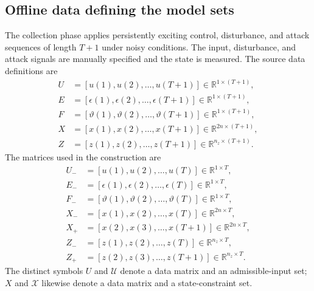 \documentclass{article}
\begin{document}
\subsection*{Offline data defining the model sets}
The collection phase applies persistently exciting control, disturbance, and attack sequences of length $T+1$ under noisy conditions. The input, disturbance, and attack signals are manually specified and the state is measured. The source data definitions are
\begin{align}
U&=[u(1),u(2),\ldots,u(T+1)]\in\mathbb{R}^{1\times(T+1)}, \tag{23a}\\
E&=[\epsilon(1),\epsilon(2),\ldots,\epsilon(T+1)]\in\mathbb{R}^{1\times(T+1)}, \tag{23b}\\
F&=[\vartheta(1),\vartheta(2),\ldots,\vartheta(T+1)]\in\mathbb{R}^{1\times(T+1)}, \tag{23c}\\
X&=[x(1),x(2),\ldots,x(T+1)]\in\mathbb{R}^{2n\times(T+1)}, \tag{23d}\\
Z&=[z(1),z(2),\ldots,z(T+1)]\in\mathbb{R}^{n_z\times(T+1)}. \tag{24}
\end{align}
The matrices used in the construction are
\begin{align}
U_-&=[u(1),u(2),\ldots,u(T)]\in\mathbb{R}^{1\times T}, \tag{25a}\\
E_-&=[\epsilon(1),\epsilon(2),\ldots,\epsilon(T)]\in\mathbb{R}^{1\times T}, \tag{25b}\\
F_-&=[\vartheta(1),\vartheta(2),\ldots,\vartheta(T)]\in\mathbb{R}^{1\times T}, \tag{25c}\\
X_-&=[x(1),x(2),\ldots,x(T)]\in\mathbb{R}^{2n\times T}, \tag{25d}\\
X_+&=[x(2),x(3),\ldots,x(T+1)]\in\mathbb{R}^{2n\times T}, \tag{25e}\\
Z_-&=[z(1),z(2),\ldots,z(T)]\in\mathbb{R}^{n_z\times T}, \tag{25f}\\
Z_+&=[z(2),z(3),\ldots,z(T+1)]\in\mathbb{R}^{n_z\times T}. \tag{25g}
\end{align}
The distinct symbols $U$ and $\mathcal{U}$ denote a data matrix and an admissible-input set; $X$ and $\mathcal{X}$ likewise denote a data matrix and a state-constraint set.
\end{document}
